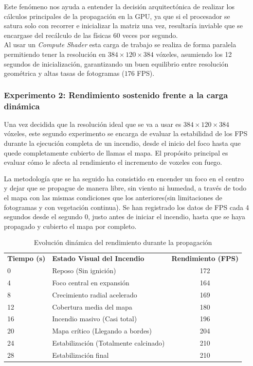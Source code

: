     Este fenómeno nos ayuda a entender la decisión arquitectónica de realizar los cálculos principales de la propagación en la GPU, ya que  si el procesador se satura solo con recorrer e inicializar la matriz una vez, resultaría inviable que se encargase del recálculo de las físicas 60 veces por segundo.\\

    Al usar un \textit{Compute Shader} esta carga de trabajo se realiza de forma paralela  permitiendo tener la resolución en $384 \times 120 \times 384$ vóxeles, asumiendo los 12 segundos de inicialización, garantizando un buen equilibrio entre resolución geométrica y altas tasas de fotogramas ($176$ FPS).

\subsubsection*{Experimento 2: Rendimiento sostenido frente a la carga dinámica}

    Una vez decidida que la resolución ideal que se va a usar es $384 \times 120 \times 384$ vóxeles, este segundo experimento se encarga de evaluar la estabilidad de los FPS durante la ejecución completa de un incendio, desde el inicio del foco hasta que quede completamente cubierto de llamas el mapa. El propósito principal es evaluar cómo le afecta al rendimiento el incremento de voxeles con fuego.

    La metodología que se ha seguido ha consistido en encender un foco en el centro y dejar que se propague de manera libre, sin viento ni humedad, a través de todo el mapa con las mismas condiciones que los anteriores(sin limitaciones de fotogramas y con vegetación continua).  Se han registrado los datos de FPS cada 4 segundos desde el segundo 0, justo antes de iniciar el incendio, hasta que se haya propagado y cubierto el mapa por completo.

    \begin{table}[H]
    \centering
    \begin{tabular}{l l c}
    \textbf{Tiempo (s)} & \textbf{Estado Visual del Incendio} & \textbf{Rendimiento (FPS)} \\
    0 & Reposo (Sin ignición) & 172 \\
    4 & Foco central en expansión & 164 \\
    8 & Crecimiento radial acelerado & 169 \\
    12 & Cobertura media del mapa & 180 \\
    16 & Incendio masivo (Casi total) & 196 \\
    20 & Mapa crítico (Llegando a bordes) & 204 \\
    24 & Estabilización (Totalmente calcinado) & 210 \\
    28 & Estabilización final & 210 \\
    \end{tabular}
    \caption[Evolución del rendimiento durante la propagación ]{Evolución dinámica del rendimiento durante la propagación }
    \label{tab:carga_termica}
    \end{table}

